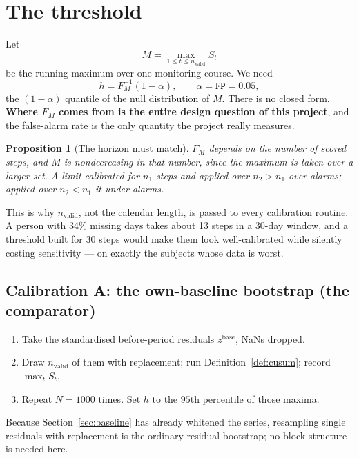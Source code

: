 \documentclass{article}
\theoremstyle{plain}
\newtheorem{proposition}[theorem]{Proposition}
\theoremstyle{definition}
\theoremstyle{remark}
\numberwithin{equation}{section}
\begin{document}
\section{The threshold}
\label{sec:threshold}

Let
\[
  M = \max_{1 \le t \le n_{\mathrm{valid}}} S_t
\]
be the running maximum over one monitoring course. We need
\[
  h = F_M^{-1}(1-\alpha), \qquad \alpha = \texttt{FP} = 0.05,
\]
the $(1-\alpha)$ quantile of the null distribution of $M$. There is no closed
form. \textbf{Where $F_M$ comes from is the entire design question of this
project}, and the false-alarm rate is the only quantity the project really
measures.

\begin{proposition}[The horizon must match]
\label{prop:horizon}
$F_M$ depends on the number of \emph{scored steps}, and $M$ is nondecreasing in
that number, since the maximum is taken over a larger set. A limit calibrated
for $n_1$ steps and applied over $n_2 > n_1$ over-alarms; applied over
$n_2 < n_1$ it under-alarms.
\end{proposition}

This is why $n_{\mathrm{valid}}$, not the calendar length, is passed to every
calibration routine. A person with 34\% missing days takes about 13 steps in a
30-day window, and a threshold built for 30 steps would make them look
well-calibrated while silently costing sensitivity --- on exactly the subjects
whose data is worst.

\subsection{Calibration A: the own-baseline bootstrap (the comparator)}

\begin{enumerate}[nosep]
  \item Take the standardised before-period residuals $z^{\mathrm{base}}$,
    $\mathrm{NaN}$s dropped.
  \item Draw $n_{\mathrm{valid}}$ of them with replacement; run
    Definition~\ref{def:cusum}; record $\max_t S_t$.
  \item Repeat $N = 1000$ times. Set $h$ to the $95$th percentile of those
    maxima.
\end{enumerate}

Because Section~\ref{sec:baseline} has already whitened the series, resampling
single residuals with replacement is the ordinary residual bootstrap; no block
structure is needed here.
\end{document}
